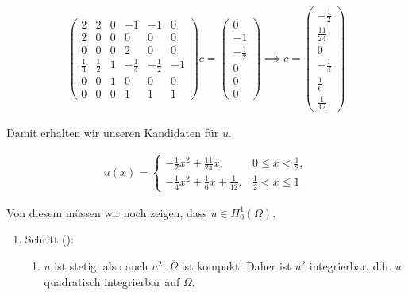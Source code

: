 \begin{solution}
\begin{align*}
  \begin{pmatrix}
    2 & 2 & 0 & -1 & -1 & 0 \\
    2 & 0 & 0 &  0 &  0 & 0 \\
    0 & 0 & 0 &  2 &  0 & 0 \\
    \frac{1}{4} & \frac{1}{2} & 1 & -\frac{1}{4} & -\frac{1}{2} & -1 \\
    0 & 0 & 1 &  0 &  0 & 0 \\
    0 & 0 & 0 &  1 &  1 & 1
  \end{pmatrix}
  c
  =
  \begin{pmatrix}
    0 \\ -1 \\ -\frac{1}{2} \\ 0 \\ 0 \\ 0
  \end{pmatrix}
  \implies
  c
  =
  \begin{pmatrix}
    -\frac{1}{2} \\ \frac{11}{24} \\ 0 \\ -\frac{1}{4} \\ \frac{1}{6} \\ \frac{1}{12}
  \end{pmatrix}
\end{align*}

Damit erhalten wir unseren Kandidaten für $u$.

\begin{align*}
  u(x)
  =
  \begin{cases}
    -\frac{1}{2} x^2 + \frac{11}{24} x,              & 0 \leq x < \frac{1}{2}, \\
    -\frac{1}{4} x^2 + \frac{1}{6} x + \frac{1}{12}, & \frac{1}{2} < x \leq 1
  \end{cases}
\end{align*}

Von diesem müssen wir noch zeigen, dass $u \in H_0^1(\Omega)$.

\begin{enumerate}[label = \arabic*.]

  \item Schritt ():

  \begin{enumerate}[label = (\roman*)]

    \item $u$ ist stetig, also auch $u^2$.
    $\overline{\Omega}$ ist kompakt.
    Daher ist $u^2$ integrierbar, d.h. $u$ quadratisch integrierbar auf $\Omega$.


\end{enumerate}
\end{enumerate}
\end{solution}
